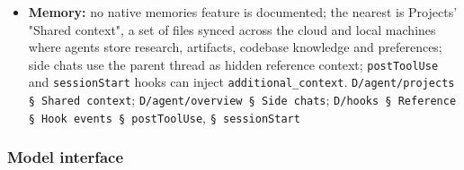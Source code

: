 \begin{itemize}
\item \textbf{Memory:} no native memories feature is documented; the nearest is Projects' "Shared context", a set of files synced across the cloud and local machines where agents store research, artifacts, codebase knowledge and preferences; side chats use the parent thread as hidden reference context; \texttt{postToolUse} and \texttt{sessionStart} hooks can inject \texttt{additional\_\allowbreak{}context}. \texttt{D/\allowbreak{}agent/\allowbreak{}projects § Shared context}; \texttt{D/\allowbreak{}agent/\allowbreak{}overview § Side chats}; \texttt{D/\allowbreak{}hooks § Reference § Hook events § postToolUse}, \texttt{§ sessionStart}
\end{itemize}

\subsubsection*{Model interface}
